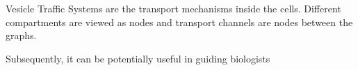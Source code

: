 Vesicle Traffic Systems are the transport mechanisms inside the cells.
%
Different compartments are viewed as nodes and transport channels are
nodes between the graphs.


Subsequently, it can be potentially useful in guiding biologists


